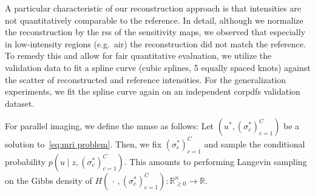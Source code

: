 \documentclass[twocolumn]{article}
\newcommand{\R}{\mathbb{R}}
\newcommand{\optimal}[1]{#1^{*}}
\begin{document}
A particular characteristic of our reconstruction approach is that  intensities are not quantitatively comparable to the reference.
In detail, although we normalize the reconstruction by the \gls{rss} of the sensitivity maps, we observed that especially in low-intensity regions (e.g.\ air) the reconstruction did not match the reference.
To remedy this and allow for fair quantitative evaluation, we utilize the validation data to fit a spline curve (cubic splines, \num{5} equally spaced knots) against the scatter of reconstructed and reference intensities.
For the generalization experiments, we fit the spline curve again on an independent \gls{corpdfs} validation dataset.

For parallel imaging, we define the \gls{mmse} as follows:
Let \( (\optimal{u}, {(\optimal{\sigma}_c)}_{c=1}^C) \) be a solution to~\cref{eq:mri problem}.
Then, we fix \( {(\optimal{\sigma}_c)}_{c=1}^C \) and sample the conditional probability \( p(u \mid z, {(\optimal{\sigma}_c)}_{c=1}^C ) \).
This amounts to performing Langevin sampling on the Gibbs density of \( H(\, \cdot \,, {(\optimal{\sigma}_c)}_{c=1}^C) \colon \R_{\geq0}^n \to \R \).

\end{document}

